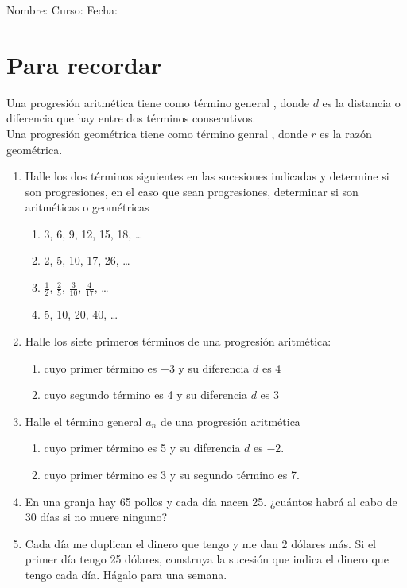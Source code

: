\documentclass[fleqn]{article}
\newcommand{\LineaNombre}{%
\par
\vspace{\baselineskip}
Nombre:\hrulefill \; Curso: \underline{\hspace*{48pt}} \; Fecha: \underline{\hspace*{2.5cm}} \relax
\par}
\begin{document}
\LineaNombre
\section*{Para recordar}
Una progresi\'on aritmética tiene como término general , donde $d$ es la distancia o diferencia que hay entre dos términos consecutivos.\\

Una progresión geométrica tiene como término genral ,
donde $r$ es la razón geométrica.
\begin{enumerate}
\item Halle los dos términos siguientes en las sucesiones indicadas y determine si son progresiones, en el caso que sean progresiones, determinar si son aritméticas o geométricas
\begin{enumerate}
\item 3, 6, 9, 12, 15, 18, \ldots \noanswer
\item 2, 5, 10, 17, 26, \ldots \noanswer
\item $\frac{1}{2}$, $\frac{2}{5}$, $\frac{3}{10}$, $\frac{4}{17}$, \ldots \noanswer
\item 5, 10, 20, 40, \ldots \noanswer
\end{enumerate}
\item Halle los siete primeros términos de una progresión aritmética:
\begin{enumerate}
\item cuyo primer término es $-3$ y su diferencia $d$ es 4 \noanswer[.75in]
\item cuyo segundo término es 4 y su diferencia $d$ es 3 \noanswer[.75in]
\end{enumerate}
\newpage
\item Halle el término general $a_{n}$ de una progresión aritmética
\begin{enumerate}
\item cuyo primer término es 5 y su diferencia $d$ es $-2$. \noanswer
\item cuyo primer término es 3 y su segundo término es 7.\noanswer
\end{enumerate}
\item En una granja hay 65 pollos y cada día nacen 25. ¿cuántos habrá al cabo de 30 días si no muere ninguno?\noanswer
\item Cada día me duplican el dinero que tengo y me dan 2 dólares más. Si el primer día tengo 25 dólares, construya la sucesión que indica el dinero que tengo cada día. Hágalo para una semana.\noanswer
\end{enumerate}
\end{document}
